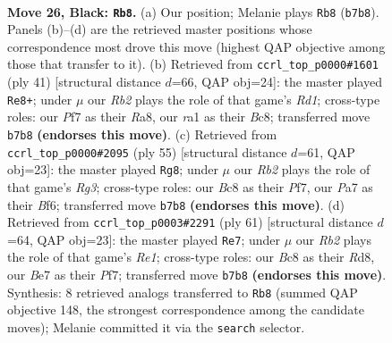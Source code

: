 \documentclass[11pt]{article}
\begin{document}
\clearpage

\begin{figure}[p]\centering
\begin{subfigure}{0.46\textwidth}\centering
\resizebox{\linewidth}{!}{%
\newchessgame
\chessboard[
  setfen={2b1k3/prp1bp1r/P1p3p1/2P4p/1P3P1P/2B5/7R/RN2K3 b Q - 0 26},
  showmover=false,
  pgfstyle=straightmove, color=movearrow, markmove={b7-b8}
]}
\caption{}
\end{subfigure}\hfill
\begin{subfigure}{0.46\textwidth}\centering
\resizebox{\linewidth}{!}{%
\newchessgame
\chessboard[
  setfen={r1br2k1/2B2ppp/1pn5/p1b2PPP/8/P1N2B2/1P6/R3K2R b KQ - 0 21},
  showmover=false,
  pgfstyle=straightmove, color=movearrow, markmove={d8-e8}
]}
\caption{}
\end{subfigure}
\\[4pt]
\begin{subfigure}{0.46\textwidth}\centering
\resizebox{\linewidth}{!}{%
\newchessgame
\chessboard[
  setfen={4k3/1r2pp2/3p1brp/p2P4/Pp6/3B1PPR/1PP5/1K1R4 b - - 2 28},
  showmover=false,
  pgfstyle=straightmove, color=movearrow, markmove={g6-g8}
]}
\caption{}
\end{subfigure}\hfill
\begin{subfigure}{0.46\textwidth}\centering
\resizebox{\linewidth}{!}{%
\newchessgame
\chessboard[
  setfen={3rr1k1/5ppp/8/p1Np1bPP/3P4/pP2BP1n/8/K3R2R b - - 1 31},
  showmover=false,
  pgfstyle=straightmove, color=movearrow, markmove={e8-e7}
]}
\caption{}
\end{subfigure}
\caption{\textbf{Move 26, Black: \texttt{Rb8}.} (a) Our position; Melanie plays \texttt{Rb8} (\texttt{b7b8}). Panels (b)--(d) are the retrieved master positions whose correspondence most drove this move (highest QAP objective among those that transfer to it). (b) Retrieved from \texttt{ccrl\_top\_p0000\#1601} (ply 41) [structural distance $d$=66, QAP obj=24]: the master played \texttt{Re8+}; under $\mu$ our \emph{Rb2} plays the role of that game's \emph{Rd1}; cross-type roles: our \emph{P}f7 as their \emph{R}a8, our \emph{r}a1 as their \emph{B}c8; transferred move \texttt{b7b8} \textbf{(endorses this move)}. (c) Retrieved from \texttt{ccrl\_top\_p0000\#2095} (ply 55) [structural distance $d$=61, QAP obj=23]: the master played \texttt{Rg8}; under $\mu$ our \emph{Rb2} plays the role of that game's \emph{Rg3}; cross-type roles: our \emph{B}c8 as their \emph{P}f7, our \emph{P}a7 as their \emph{B}f6; transferred move \texttt{b7b8} \textbf{(endorses this move)}. (d) Retrieved from \texttt{ccrl\_top\_p0003\#2291} (ply 61) [structural distance $d$=64, QAP obj=23]: the master played \texttt{Re7}; under $\mu$ our \emph{Rb2} plays the role of that game's \emph{Re1}; cross-type roles: our \emph{B}c8 as their \emph{R}d8, our \emph{B}e7 as their \emph{P}f7; transferred move \texttt{b7b8} \textbf{(endorses this move)}. Synthesis: 8 retrieved analogs transferred to \texttt{Rb8} (summed QAP objective 148, the strongest correspondence among the candidate moves); Melanie committed it via the \texttt{search} selector.}
\label{fig:thought-m51}
\end{figure}
\end{document}
